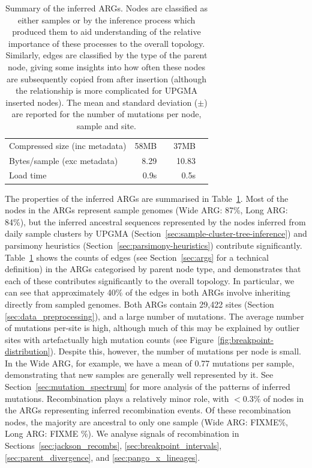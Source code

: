 \documentclass{article}
\begin{document}
\begin{table}
\begin{center}
\begin{tabular}{llrlrl}
    \cmidrule{2-6}
    \multicolumn{2}{l}{Compressed size (inc metadata)} & 58MB & & 37MB&  \\
    \multicolumn{2}{l}{Bytes/sample (exc metadata)}  & 8.29  & & 10.83 \\
    Load time & & 0.9s & & 0.5s & \\
    \bottomrule
\end{tabular}
\end{center}
\caption{\label{tab:args}Summary of the inferred ARGs. Nodes are classified
as either samples or by the inference process which produced them to aid
understanding of the relative importance of these processes to the overall
topology. Similarly, edges are classified by the type of the parent node,
giving some insights into how often these nodes are subsequently
copied from after insertion (although the relationship is more complicated
for UPGMA inserted nodes). The mean and standard deviation ($\pm$)
are reported for the number of mutations per node, sample and site.
}
\end{table}

The properties of the inferred ARGs are summarised in Table~\ref{tab:args}.
Most of the nodes in the ARGs represent sample genomes
(Wide ARG: 87\%, Long ARG: 84\%), but the inferred ancestral sequences
represented by the nodes inferred from daily sample clusters
by UPGMA (Section~\ref{sec:sample-cluster-tree-inference})
and parsimony heuristics (Section~\ref{sec:parsimony-heuristics})
contribute significantly.
Table~\ref{tab:args} shows the counts of edges (see
Section~\ref{sec:args} for a technical definition) in the ARGs
categorised by parent node type, and demonstrates that each
of these contributes significantly to the overall topology.
In particular, we can see that approximately 40\% of the edges
in both ARGs involve inheriting directly from sampled genomes.
Both ARGs contain 29,422 sites (Section \ref{sec:data_preprocessing}),
and a large number of mutations.
The average number of mutations per-site is high, although much
of this may be explained by outlier sites with artefactually high
mutation counts (see Figure~\ref{fig:breakpoint-distribution}).
Despite this, however, the number of mutations per node
is small. In the Wide ARG, for example, we have a mean of 0.77
mutations per sample, demonstrating that new samples are generally
well represented by it. See Section~\ref{sec:mutation_spectrum}
for more analysis of the patterns of inferred mutations.
Recombination plays a relatively minor role, with $<0.3\%$
of nodes in the ARGs representing inferred recombination events.
Of these recombination nodes, the majority are ancestral
to only one sample (Wide ARG: FIXME\%, Long ARG: FIXME \%).
We analyse signals of recombination in Sections~\ref{sec:jackson_recombs},
\ref{sec:breakpoint_intervals}, \ref{sec:parent_divergence},
and \ref{sec:pango_x_lineages}.
\end{document}
